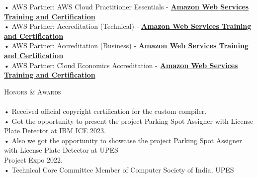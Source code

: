 \documentclass[a4paper]{article}
\newcommand{\lineunder} {
    \vspace*{-8pt} \\
    \hspace*{-18pt} \hrulefill \\
}
\newcommand{\header} [1] {
    {\hspace*{-18pt}\vspace*{6pt} \textsc{#1}}
    \vspace*{-6pt} \lineunder
}
\begin{document}
     • AWS Partner: AWS Cloud Practitioner Essentials -  \textbf{\href{https://drive.google.com/file/d/1of0rvY1uMqwD-5YqXAQzMT767HK_nPUX/view}{Amazon Web Services Training and Certification}}\\
\vspace*{1mm}
      • AWS Partner: Accreditation (Technical) - \textbf{\href{https://www.credly.com/badges/3885872d-d920-4e07-8885-ea244bc06c49/public\_url}{Amazon Web Services Training and Certification}}\\
\vspace*{1mm}
      • AWS Partner: Accreditation (Business) - \textbf{\href{https://www.credly.com/badges/86cdbee2-ba67-43ba-983c-3935796429e5/public_url}{Amazon Web Services Training and Certification}}\\
\vspace*{1mm}
      • AWS Partner: Cloud Economics Accreditation - \textbf{\href{https://www.credly.com/badges/87c54f12-9a82-429e-8d87-8b3ecee48b13/public\_url}{Amazon Web Services Training and Certification}}\\
\vspace*{1mm}
      \vspace{2mm}
\header{Honors \& Awards}
      \vspace{2mm} 
      • Received official copyright certification for the custom compiler.\\
      • Got the opportunity to present the project Parking Spot Assigner with License Plate Detector at IBM ICE 2023.\\
      •  Also we got the opportunity to showcase the project Parking Spot Assigner with License  Plate Detector at UPES\\ 
        \hspace{2mm} Project Expo 2022.\\
      • Technical Core Committee Member of Computer Society of India, UPES\\
\vspace*{1mm}

    \ 
    
\end{document}

